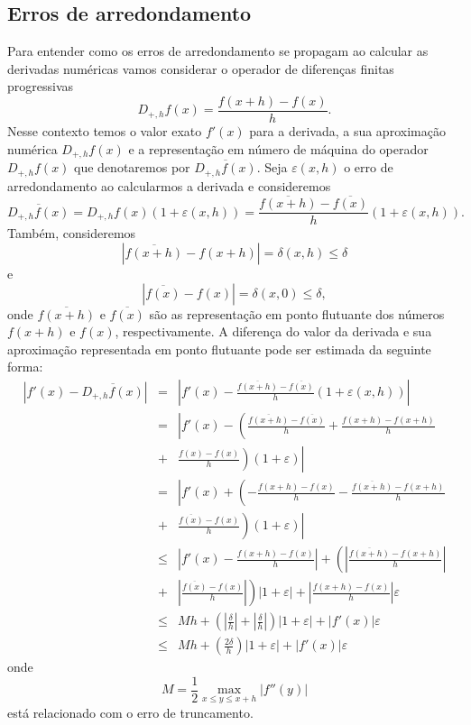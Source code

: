\subsection{Erros de arredondamento}
Para entender como os erros de arredondamento se propagam ao calcular as derivadas numéricas vamos considerar o operador de diferenças finitas progressivas
$$
D_{+,h}f(x) =\frac{f(x+h)-f(x)}{h}.
$$
Nesse contexto temos o valor exato $f'(x)$ para a derivada, a sua aproximação numérica $D_{+,h}f(x)$ e a representação em número de máquina do operador $D_{+,h}f(x)$ que denotaremos por $\overline{D_{+,h}f(x)}$. Seja $\varepsilon(x,h)$ o erro de arredondamento ao calcularmos a derivada e consideremos
$$
\overline{D_{+,h}f(x)}=D_{+,h}f(x)(1+\varepsilon(x,h))=\frac{\overline{f(x+h)}-\overline{f(x)}}{h}(1+\varepsilon(x,h)).
$$
Também, consideremos
$$
|\overline{f(x+h)}-f(x+h)|=\delta(x,h)\leq \delta
$$
e
$$
|\overline{f(x)}-f(x)|=\delta(x,0)\leq \delta,
$$
onde $\overline{f(x+h)}$ e $\overline{f(x)}$ são as representação em ponto flutuante dos números $f(x+h)$ e $f(x)$, respectivamente. A diferença do valor da derivada e sua aproximação representada em ponto flutuante pode ser estimada da seguinte forma:
\begin{eqnarray*}
\left|f'(x)-\overline{D_{+,h}f(x)}\right|&=& \left| f'(x)-\frac{\overline{f(x+h)}-\overline{f(x)}}{h}(1+\varepsilon(x,h)) \right|\\
&=& \left| f'(x)-\left(\frac{\overline{f(x+h)}-\overline{f(x)}}{h}+\frac{f(x+h)-f(x+h)}{h}\right.\right. \\
&+& \left.\left.\frac{f(x)-f(x)}{h}\right)(1+\varepsilon) \right|\\
&=& \left| f'(x)+\left(-\frac{f(x+h)-f(x)}{h}-\frac{\overline{f(x+h)}-f(x+h)}{h}\right.\right.\\
&+& \left.\left. \frac{\overline{f(x)}-f(x)}{h}\right)(1+\varepsilon) \right|\\
&\leq& \left|f'(x)-\frac{f(x+h)-f(x)}{h}\right| +\left(\left|\frac{\overline{f(x+h)}-f(x+h)}{h}\right|\right.\\
&+&\left.\left|\frac{\overline{f(x)}-f(x)}{h}\right| \right)|1+\varepsilon| + \left|\frac{f(x+h)-f(x)}{h}\right|\varepsilon\\
&\leq& Mh +\left(\left|\frac{\delta}{h}\right|+\left|\frac{\delta}{h}\right| \right)|1+\varepsilon| +|f'(x)|\varepsilon\\
&\leq& Mh +\left(\frac{2\delta}{h}\right)|1+\varepsilon| +|f'(x)|\varepsilon
\end{eqnarray*}
onde
$$
M=\frac{1}{2}\max_{x\leq y\leq x+h}|f''(y)|
$$
está relacionado com o erro de truncamento.

